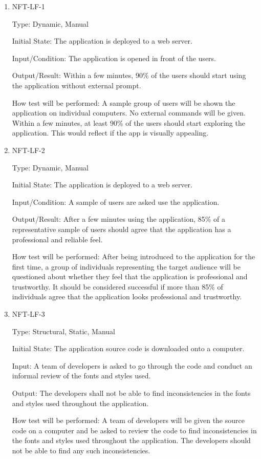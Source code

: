 \documentclass[12pt, titlepage]{article}
\begin{document}
\begin{enumerate}

\item{NFT-LF-1}

Type: Dynamic, Manual
					
Initial State: The application is deployed to a web server.
					
Input/Condition: The application is opened in front of the users.
					
Output/Result: Within a few minutes, 90\% of the users should start using the application without external prompt.
					
How test will be performed: A sample group of users will be shown the application on individual computers. No external commands will be given. Within a few minutes, at least 90\% of the users should start exploring the application. This would reflect if the app is visually appealing.

\item{NFT-LF-2}

Type: Dynamic, Manual
					
Initial State: The application is deployed to a web server.
					
Input/Condition: A sample of users are asked use the application.
					
Output/Result: After a few minutes using the application, 85\% of a representative sample of users should agree that the application has a professional and reliable feel.
					
How test will be performed: After being introduced to the application for the first time, a group of individuals representing the target audience will be questioned about whether they feel that the application is professional and trustworthy. It should be considered successful if more than 85\% of individuals agree that the application looks professional and trustworthy.

\item{NFT-LF-3}

Type: Structural, Static, Manual
					
Initial State: The application source code is downloaded onto a computer.
					
Input: A team of developers is asked to go through the code and conduct an informal review of the fonts and styles used.
					
Output: The developers shall not be able to find inconsistencies in the fonts and styles used throughout the application.
					
How test will be performed: A team of developers will be given the source code on a computer and be asked to review the code to find inconsistencies in the fonts and styles used throughout the application. The developers should not be able to find any such inconsistencies.

\end{enumerate}
\end{document}
